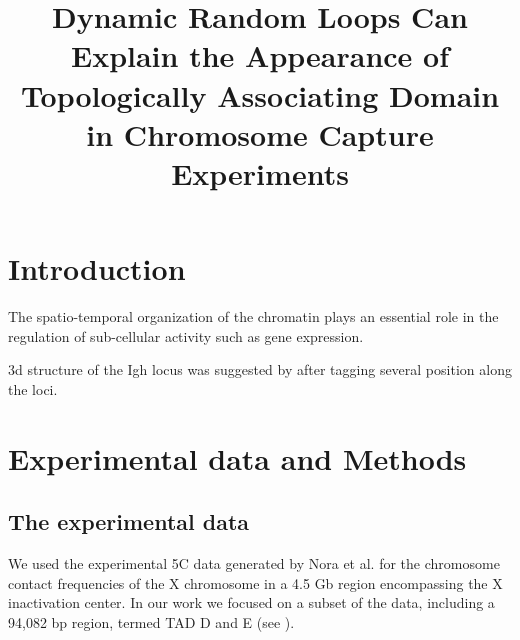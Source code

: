 \documentclass[12pt]{paper}
\begin{document}
\title{Dynamic Random Loops Can Explain the Appearance of Topologically Associating Domain in Chromosome Capture Experiments}
\maketitle

\section{Introduction}\label{section_introduction}

The spatio-temporal organization of the chromatin plays an essential role in the regulation of sub-cellular activity such as gene expression\cite{cremer2001chromosome}. 




3d structure of the Igh locus was suggested by \cite{jhunjhunwala20083d} after tagging several position along the loci. 


\section{Experimental data and Methods}\label{section_experimentalDataAndMethods}

\subsection{The experimental data}\label{subsection_theExperimentalData}
We used the experimental 5C data generated by Nora et al.\cite{Nora2012} for the chromosome contact frequencies of the X chromosome in a 4.5 Gb region encompassing the X inactivation center. In our work we focused on a subset of the data, including a 94,082 bp region, termed TAD D and E (see \cite{Nora2012}). 
\end{document}
